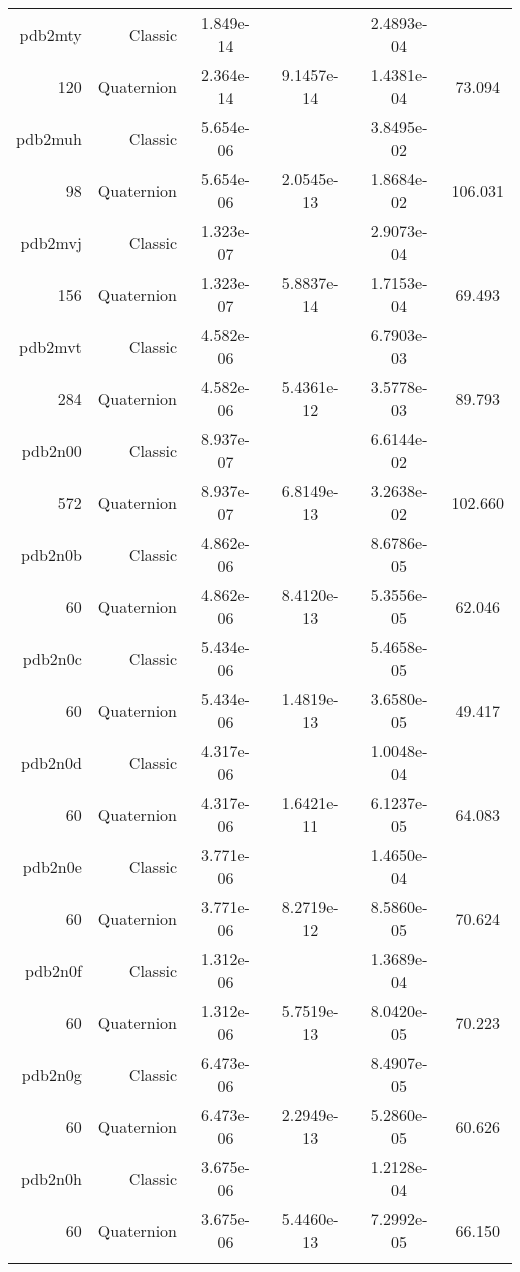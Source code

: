 \begin{xltabular}{\textwidth}{r|rS[table-format=1.3e+2]S[table-format=1.4e+2]S[table-format=1.4e+2]S[table-format=-1.3]}
pdb2mty & Classic & 1.849e-14 &  & 2.4893e-04 & \\
120 & Quaternion & 2.364e-14 & 9.1457e-14 & 1.4381e-04 & 73.094\\  \addlinespace
pdb2muh & Classic & 5.654e-06 &  & 3.8495e-02 & \\
98 & Quaternion & 5.654e-06 & 2.0545e-13 & 1.8684e-02 & 106.031\\  \addlinespace
pdb2mvj & Classic & 1.323e-07 &  & 2.9073e-04 & \\
156 & Quaternion & 1.323e-07 & 5.8837e-14 & 1.7153e-04 & 69.493\\  \addlinespace
pdb2mvt & Classic & 4.582e-06 &  & 6.7903e-03 & \\
284 & Quaternion & 4.582e-06 & 5.4361e-12 & 3.5778e-03 & 89.793\\  \addlinespace
pdb2n00 & Classic & 8.937e-07 &  & 6.6144e-02 & \\
572 & Quaternion & 8.937e-07 & 6.8149e-13 & 3.2638e-02 & 102.660\\  \addlinespace
pdb2n0b & Classic & 4.862e-06 &  & 8.6786e-05 & \\
60 & Quaternion & 4.862e-06 & 8.4120e-13 & 5.3556e-05 & 62.046\\  \addlinespace
pdb2n0c & Classic & 5.434e-06 &  & 5.4658e-05 & \\
60 & Quaternion & 5.434e-06 & 1.4819e-13 & 3.6580e-05 & 49.417\\  \addlinespace
pdb2n0d & Classic & 4.317e-06 &  & 1.0048e-04 & \\
60 & Quaternion & 4.317e-06 & 1.6421e-11 & 6.1237e-05 & 64.083\\  \addlinespace
pdb2n0e & Classic & 3.771e-06 &  & 1.4650e-04 & \\
60 & Quaternion & 3.771e-06 & 8.2719e-12 & 8.5860e-05 & 70.624\\  \addlinespace
pdb2n0f & Classic & 1.312e-06 &  & 1.3689e-04 & \\
60 & Quaternion & 1.312e-06 & 5.7519e-13 & 8.0420e-05 & 70.223\\  \addlinespace
pdb2n0g & Classic & 6.473e-06 &  & 8.4907e-05 & \\
60 & Quaternion & 6.473e-06 & 2.2949e-13 & 5.2860e-05 & 60.626\\  \addlinespace
pdb2n0h & Classic & 3.675e-06 &  & 1.2128e-04 & \\
60 & Quaternion & 3.675e-06 & 5.4460e-13 & 7.2992e-05 & 66.150\\  \addlinespace

\end{xltabular}
